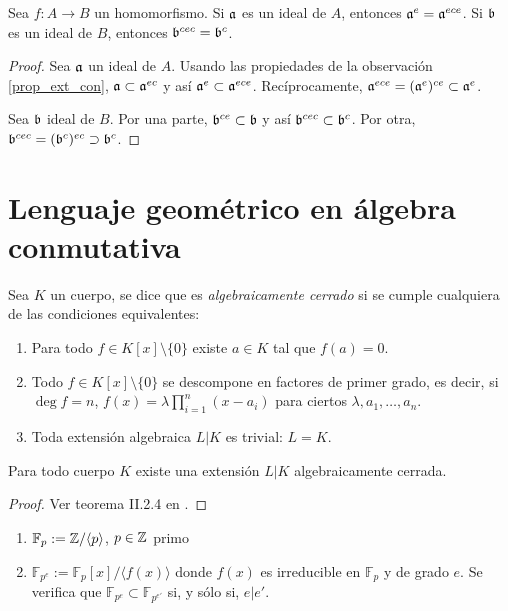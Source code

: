 \documentclass[./main.tex]{subfiles}
\begin{document}
\begin{lemma}\label{ext-cont-ext}
	Sea $f:A\to B$ un homomorfismo. Si $\mathfrak{a}$ es un ideal de $A$, entonces $\mathfrak{a}^e = \mathfrak{a}^{ece}$. Si $\mathfrak{b}$ es un ideal de $B$, entonces $\mathfrak{b}^{cec} = \mathfrak{b}^c$.
\end{lemma}

\begin{proof}
	Sea $\mathfrak{a}$ un ideal de $A$. Usando las propiedades de la observación \ref{prop_ext_con}, $\mathfrak{a} \subset \mathfrak{a}^{ec}$ y así $\mathfrak{a}^e \subset \mathfrak{a}^{ece}$. Recíprocamente, $\mathfrak{a}^{ece} = (\mathfrak{a}^e)^{ce} \subset \mathfrak{a} ^e$.

	Sea $\mathfrak{b}$ ideal de $B$. Por una parte, $\mathfrak{b}^{ce} \subset \mathfrak{b}$ y así $\mathfrak{b}^{cec} \subset \mathfrak{b}^c$. Por otra, $\mathfrak{b}^{cec} = (\mathfrak{b}^c)^{ec} \supset \mathfrak{b}^c$.
\end{proof}

	\section{Lenguaje geométrico en álgebra conmutativa}

	\begin{definition}
		Sea $K$ un cuerpo, se dice que es \emph{algebraicamente cerrado} si se cumple cualquiera de las condiciones equivalentes:
		\begin{enumerate}
			\item Para todo $f\in K[x]\setminus\{0\}$ existe $a\in K$ tal que $f(a)=0$.
			\item Todo $f\in K[x]\setminus\{0\}$ se descompone en factores de primer grado, es decir, si $\deg f = n$, $f(x) =\lambda \prod_{i=1}^n (x-a_i)$ para ciertos $\lambda, a_1, \dots, a_n$.
			\item Toda extensión algebraica $L\vert K$ es trivial: $L = K$.
		\end{enumerate}
	\end{definition}

	\begin{proposition}
		Para todo cuerpo $K$ existe una extensión $L|K$ algebraicamente cerrada.
	\end{proposition}
	\begin{proof}
		Ver teorema II.2.4 en \cite{gamboa}.
	\end{proof}

	\begin{example}
		\begin{enumerate}
			\item $\mathbb{F}_p:=\mathbb{Z}/\langle p\rangle$, $p\in\mathbb{Z}$ primo
			\item $\mathbb{F}_{p^e}:=\mathbb{F}_p[x]/\langle f(x)\rangle$ donde $f(x)$ es irreducible en $\mathbb{F}_p$ y de grado $e$. Se verifica que $\mathbb{F}_{p^{e}}\subset\mathbb{F}_{p^{e'}}$ si, y sólo si, $e|e'$.
		\end{enumerate}
	\end{example}
\end{document}
